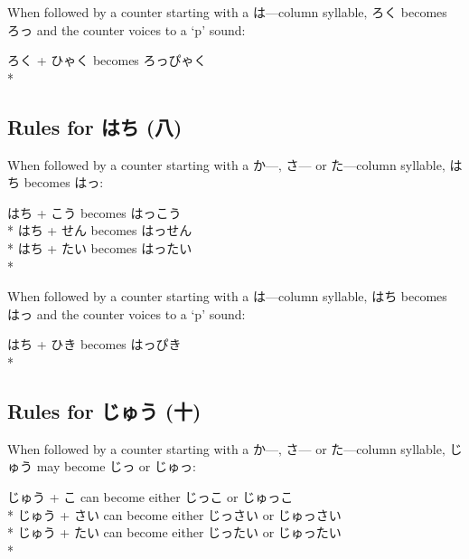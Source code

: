 \documentclass[11pt, b5paper, twoside, openright, onecolumn]{book}
\makeatletter
\newcommand*{\rubystack}[2]{{\relscale{0.5}%
  \begin{tabular}[b]{@{}c@{}}%
    {#1}\\%
   {\textscale{2}{#2}}%
  \end{tabular}}%
}
\DeclareRobustCommand*{\ruby}[2]{%
  \mbox{%
    \setlength{\parskip}{0ex}%
    \BeginAccSupp{method=pdfstringdef,ActualText={#1}}%
      \rubystack{\phantom{#2}}{#1}%
      \llap{%
        \rubystack{#2}{\phantom{#1}}%
      }%
    \EndAccSupp{}%
  }%
}
\renewcommand*{\ruby}[2]{#2 (#1)}%
\newenvironment{exampleblock}{
\setlength{\parindent}{0.6in}
\begin{minipage}[t]{\dimexpr\textwidth-\parindent}}
{\end{minipage}}
\makeatother
\begin{document}
When followed by a counter starting with a は—column syllable‚ ろく becomes ろっ and the counter voices to a ‘p’ sound:

\vspace{0.4cm}
\begin{exampleblock}
ろく + ひゃく becomes ろっぴゃく \\* 
\end{exampleblock}
\subsection{Rules for \ruby{八}{はち}}


When followed by a counter starting with a か—‚ さ— or た—column syllable‚ はち becomes はっ:

\vspace{0.4cm}
\begin{exampleblock}
はち + こう becomes はっこう \\* 
はち + せん becomes はっせん \\* 
はち + たい becomes はったい \\* 
\end{exampleblock}
\vspace{0.2cm}

When followed by a counter starting with a は—column syllable‚ はち becomes はっ and the counter voices to a ‘p’ sound:

\vspace{0.4cm}
\begin{exampleblock}
はち + ひき becomes はっぴき \\* 
\end{exampleblock}
\subsection{Rules for \ruby{十}{じゅう}}


When followed by a counter starting with a か—‚ さ— or た—column syllable‚ じゅう may become じっ or じゅっ:

\vspace{0.4cm}
\begin{exampleblock}
じゅう + こ can become either じっこ or じゅっこ \\* 
じゅう + さい can become either じっさい or じゅっさい \\* 
じゅう + たい can become either じったい or じゅったい \\* 
\end{exampleblock}
\vspace{0.2cm}
\end{document}
